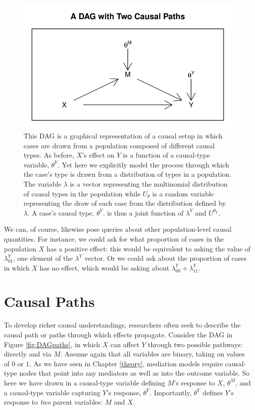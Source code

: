 \documentclass[12pt,]{book}
\begin{document}
\begin{figure}

{\centering \includegraphics[width=.5\textwidth]{ii_files/figure-latex/unnamed-chunk-16-1} 

}

\caption{\label{fig:DAGace} This DAG is a graphical representation of a causal setup in which cases are drawn from a population composed of different causal types. As before, $X$'s effect on $Y$ is a function of a causal-type variable, $\theta^Y$. Yet here we explicitly model the process through which the case's type is drawn from a distribution of types in a population. The variable $\lambda$ is a vector representing the multinomial distribution of causal types in the population while $U_\theta$ is a random variable representing the draw of each case from the distribution defined by $\lambda$. A case's causal type, $\theta^Y$, is thus a joint function of $\lambda^Y$ and $U^{\theta_Y}$.}\label{fig:unnamed-chunk-16}
\end{figure}

We can, of course, likewise pose queries about other population-level causal quantities. For instance, we could ask for what proportion of cases in the population \(X\) has a positive effect: this would be equivalent to asking the value of \(\lambda^Y_{01}\), one element of the \(\lambda^Y\) vector. Or we could ask about the proportion of cases in which \(X\) has no effect, which would be asking about \(\lambda^Y_{00} + \lambda^Y_{11}\).

\hypertarget{causal-paths}{%
\section{Causal Paths}\label{causal-paths}}

To develop richer causal understandings, researchers often seek to describe the causal path or paths through which effects propagate. Consider the DAG in Figure \ref{fig:DAGpaths}, in which \(X\) can affect \(Y\) through two possible pathways: directly and via \(M\). Assume again that all variables are binary, taking on values of \(0\) or \(1\). As we have seen in Chapter \ref{theory}, mediation models require causal-type nodes that point into any mediators as well as into the outcome variable. So here we have drawn in a causal-type variable defining \(M\)'s response to \(X\), \(\theta^M\), and a causal-type variable capturing \(Y\)'s response, \(\theta^Y\). Importantly, \(\theta^Y\) defines \(Y\)'s response to \emph{two} parent variables: \(M\) and \(X\).
\end{document}

